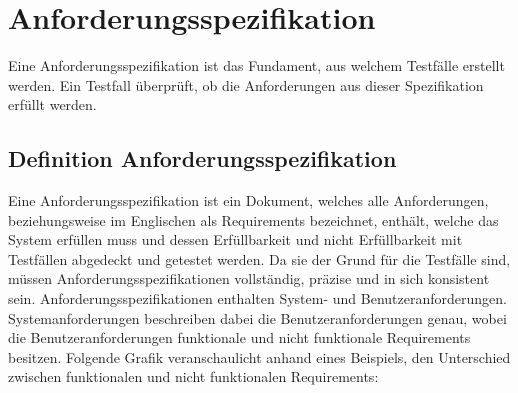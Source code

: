 \documentclass[12pt,toc=bib,toc=listof]{scrreprt}
\begin{document}
\section{Anforderungsspezifikation} %
\label{sec:anforderungsspezifikation}
Eine Anforderungsspezifikation  ist das Fundament, aus welchem Testfälle erstellt werden. Ein Testfall überprüft, ob die Anforderungen aus dieser Spezifikation erfüllt werden.

\subsection{Definition Anforderungsspezifikation} %
\label{sec:definitionAnforderungsspezifikation}
Eine Anforderungsspezifikation ist ein Dokument, welches alle Anforderungen, beziehungsweise im Englischen als Requirements bezeichnet, enthält, welche das System erfüllen muss und dessen Erfüllbarkeit und nicht Erfüllbarkeit mit Testfällen abgedeckt und getestet werden. Da sie der Grund für die Testfälle sind, müssen Anforderungsspezifikationen vollständig, präzise und in sich konsistent sein. Anforderungsspezifikationen enthalten System- und Benutzeranforderungen. Systemanforderungen beschreiben dabei die Benutzeranforderungen genau, wobei die Benutzeranforderungen funktionale und nicht funktionale Requirements besitzen. Folgende Grafik veranschaulicht anhand eines Beispiels, den Unterschied zwischen funktionalen und nicht funktionalen Requirements:
\end{document}
